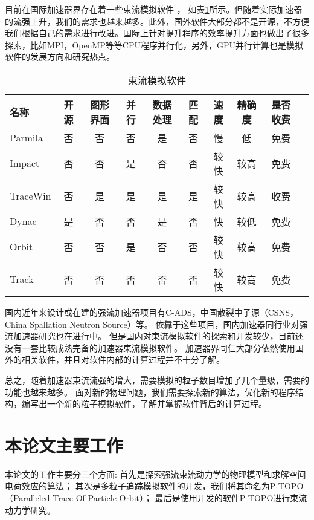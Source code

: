 目前在国际加速器界存在着一些束流模拟软件
\cite{cern_codeList,takeda1998PARMILA,qiang1999impact,uriot2014tracewin,tanke2002dynac,shishlo2006orbit,aseev2005track}，
如表\ref{tab:space_charge_code}所示。但随着实际加速器的流强上升，我们的需求也越来越多。此外，国外软件大部分都不是开源，不方便我们根据自己的需求进行改进。国际上针对提升程序的效率提升方面也做出了很多探索，比如MPI，OpenMP等等CPU程序并行化，另外，GPU并行计算也是模拟软件的发展方向和研究热点。

\begin{table}
  \centering
  \begin{tabular}{|>{\small}l|c|c|c|c|c|c|c|c|c|}
    \hline
    名称	    &开源  &图形界面 &并行	&数据处理     &匹配	&速度 &精确度	 & 是否收费  \\
    \hline
    Parmila  	&否	   &否	     &否	&是	          &否	&慢	  &低	     & 免费	\\
    Impact  	&否	   &否	     &是	&否	          &否	&较快 &较高	     & 免费	\\
    TraceWin  	&否	   &是	     &是	&是	          &是	&较快 &较高	     & 收费	\\
    Dynac  	    &是	   &否	     &否	&是	          &否	&快   &较低	     & 免费	\\
    Orbit  	    &否	   &否	     &是	&否	          &否	&较快 &较高	     & 免费	\\
    Track  	    &否	   &否	     &否	&否	          &否	&较快 &较高	     & 免费	\\
    \hline
  \end{tabular}
  \caption{束流模拟软件}
  \label{tab:space_charge_code}
\end{table}

国内近年来设计或在建的强流加速器项目有C-ADS，中国散裂中子源（CSNS，China Spallation Neutron Source）等。
依靠于这些项目，国内加速器同行业对强流加速器研究也在进行中。
但是国内对束流模拟软件的探索和开发较少，目前还没有一套比较成熟完备的加速器束流模拟软件。
加速器界同仁大部分依然使用国外的相关软件，并且对软件内部的计算过程并不十分了解。

总之，随着加速器束流流强的增大，需要模拟的粒子数目增加了几个量级，需要的功能也越来越多。
面对新的物理问题，我们需要探索新的算法，优化新的程序结构，编写出一个新的粒子模拟软件，了解并掌握软件背后的计算过程。

\section{本论文主要工作}
本论文的工作主要分三个方面:
首先是探索强流束流动力学的物理模型和求解空间电荷效应的算法；
其次是多粒子追踪模拟软件的开发，我们将其命名为P-TOPO（Paralleled Trace-Of-Particle-Orbit）；
最后是使用开发的软件P-TOPO进行束流动力学研究。

